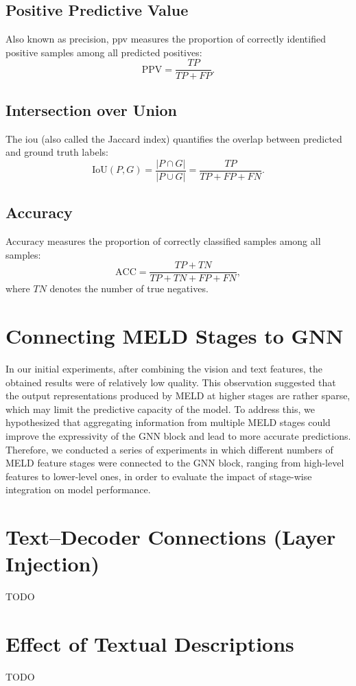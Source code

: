 \documentclass[FCD_GNN.tex]{subfiles}
\begin{document}
\subsection{Positive Predictive Value} 
Also known as precision, \ac{ppv} measures the proportion of correctly identified positive samples among all predicted positives:
\[
\mathrm{PPV} = \frac{TP}{TP + FP}.
\]

\subsection{Intersection over Union} 
The \ac{iou} (also called the Jaccard index) quantifies the overlap between predicted and ground truth labels:
\[
\mathrm{IoU}(P,G) = \frac{|P \cap G|}{|P \cup G|} = \frac{TP}{TP + FP + FN}.
\]

\subsection{Accuracy} 
Accuracy measures the proportion of correctly classified samples among all samples:
\[
\mathrm{ACC} = \frac{TP + TN}{TP + TN + FP + FN},
\]
where $TN$ denotes the number of true negatives.

\section{Connecting MELD Stages to GNN}
In our initial experiments, after combining the vision and text features, the obtained results were of relatively low quality. 
This observation suggested that the output representations produced by MELD at higher stages are rather sparse, which may limit the predictive capacity of the model. 
To address this, we hypothesized that aggregating information from multiple MELD stages could improve the expressivity of the GNN block and lead to more accurate predictions. 
Therefore, we conducted a series of experiments in which different numbers of MELD feature stages were connected to the GNN block, ranging from high-level features to lower-level ones, in order to evaluate the impact of stage-wise integration on model performance.
\section{Text--Decoder Connections (Layer Injection)}
TODO
\section{Effect of Textual Descriptions}
TODO
\end{document}
